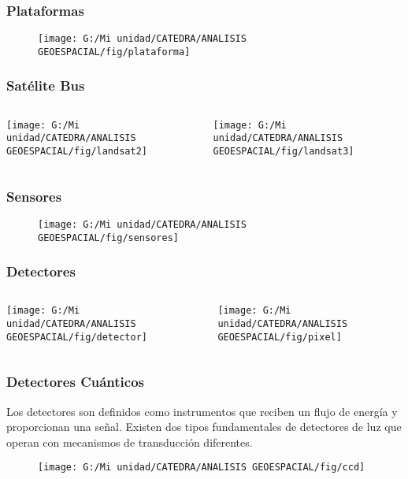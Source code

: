 \documentclass[14pt]{beamer}
\begin{document}
\begin{frame}
\frametitle{Plataformas} 
 \begin{figure}
    \centering
    \texttt{[image: G:/Mi unidad/CATEDRA/ANALISIS GEOESPACIAL/fig/plataforma]}
  \end{figure}
\end{frame}
\begin{frame}
\frametitle{Satélite Bus}
  \begin{columns}
		\begin{column}{.5\linewidth}
		 \texttt{[image: G:/Mi unidad/CATEDRA/ANALISIS GEOESPACIAL/fig/landsat2]}
		\end{column}
		\begin{column}{.5\linewidth}
\texttt{[image: G:/Mi unidad/CATEDRA/ANALISIS GEOESPACIAL/fig/landsat3]}
		\end{column}
	\end{columns}
\end{frame}
\begin{frame}
\frametitle{Sensores} 
 \begin{figure}
    \centering
    \texttt{[image: G:/Mi unidad/CATEDRA/ANALISIS GEOESPACIAL/fig/sensores]}
  \end{figure}
\end{frame}
\begin{frame}
\frametitle{Detectores}
  \begin{columns}
		\begin{column}{.3\linewidth}
		 \texttt{[image: G:/Mi unidad/CATEDRA/ANALISIS GEOESPACIAL/fig/detector]}
		\end{column}
		\begin{column}{.7\linewidth}
\texttt{[image: G:/Mi unidad/CATEDRA/ANALISIS GEOESPACIAL/fig/pixel]}
		\end{column}
	\end{columns}
\end{frame}
\begin{frame}
\frametitle{Detectores Cuánticos}
\scriptsize{
Los detectores son definidos como instrumentos que reciben un flujo de energía y proporcionan una señal. Existen dos tipos fundamentales de detectores de luz que operan con mecanismos de transducción diferentes.
}
 \begin{figure}
    \centering
    \texttt{[image: G:/Mi unidad/CATEDRA/ANALISIS GEOESPACIAL/fig/ccd]}
  \end{figure}
\end{frame}
\end{document}
